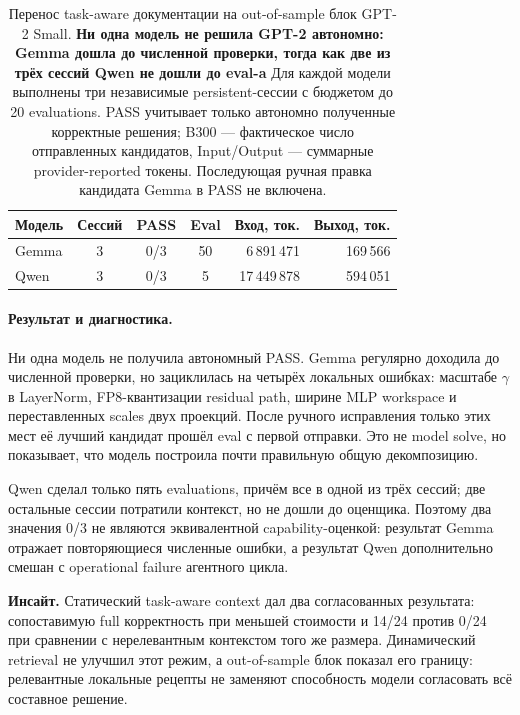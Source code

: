 \documentclass[10pt,a4paper]{article}
\newcommand{\insight}[1]{\par\smallskip\noindent\textbf{Инсайт.} #1\par\smallskip}
\begin{document}
\begin{table}[h]
\centering\footnotesize
\caption{Перенос task-aware документации на out-of-sample блок GPT-2 Small. \textbf{Ни одна модель не решила GPT-2 автономно: Gemma дошла до численной проверки, тогда как две из трёх сессий Qwen не дошли до eval-a} Для каждой модели выполнены три независимые persistent-сессии с бюджетом до 20 evaluations. PASS учитывает только автономно полученные корректные решения; B300 --- фактическое число отправленных кандидатов, Input/Output --- суммарные provider-reported токены. Последующая ручная правка кандидата Gemma в PASS не включена.}
\label{tab:compact-ood}
\begin{tabular}{lcccrr}
\toprule
Модель & Сессий & PASS & Eval & Вход, ток. & Выход, ток. \\
\midrule
Gemma & 3 & 0/3 & 50 & 6\,891\,471  & 169\,566 \\
Qwen  & 3 & 0/3 & 5  & 17\,449\,878 & 594\,051 \\
\bottomrule
\end{tabular}
\end{table}

\paragraph{Результат и диагностика.}
Ни одна модель не получила автономный PASS. Gemma регулярно доходила до
численной проверки, но зациклилась на четырёх локальных ошибках: масштабе
$\gamma$ в LayerNorm, FP8-квантизации residual path, ширине MLP workspace и
переставленных scales двух проекций. После ручного исправления только этих мест
её лучший кандидат прошёл eval с первой отправки. Это не model solve, но
показывает, что модель построила почти правильную общую декомпозицию.

Qwen сделал только пять evaluations, причём все в одной из трёх сессий;
две остальные сессии потратили контекст, но не дошли до оценщика. Поэтому два
значения 0/3 не являются эквивалентной capability-оценкой: результат Gemma
отражает повторяющиеся численные ошибки, а результат Qwen дополнительно смешан
с operational failure агентного цикла.

\insight{Статический task-aware context дал два согласованных результата:
сопоставимую full корректность при меньшей стоимости и 14/24 против
0/24 при сравнении с нерелевантным контекстом того же размера. Динамический
retrieval не улучшил этот режим, а out-of-sample блок показал его границу:
релевантные локальные рецепты не заменяют способность модели согласовать всё
составное решение.}
\end{document}
